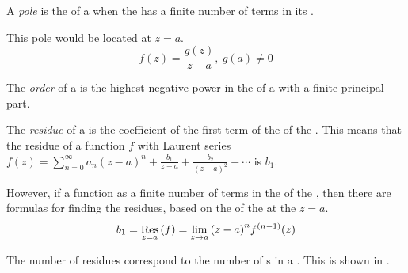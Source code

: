 \begin{definition}[Pole]\label{def:Pole}
  A \emph{pole} is the  of a  when the  has a finite number of terms in its .

  This pole would be located at $z=a$.
  \begin{equation}\label{eq:Pole}
    f(z) = \frac{g(z)}{z-a}, \: g(a) \neq 0
  \end{equation}
\end{definition}

\begin{definition}[Order]\label{def:Pole_Order}
  The \emph{order} of a  is the highest negative power in the  of a  with a finite principal part.
\end{definition}

\begin{definition}[Residue]\label{def:Residue}
  The \emph{residue} of a  is the coefficient of the first term of the  of the .
  This means that the residue of a function $f$ with Laurent series $f(z) = \sum_{n=0}^{\infty} a_{n} {(z-a)}^{n} + \frac{b_{1}}{z-a} + \frac{b_{2}}{{(z-a)}^{2}} + \cdots$ is $b_{1}$.

  However, if a function as a finite number of terms in the  of the , then there are formulas for finding the residues, based on the  of the  at the  $z=a$.
  \begin{equation}\label{eq:Residue}
    b_{1} = \Residue{f}{z=a} = \lim\limits_{z \to a} {(z-a)}^{n} f^{(n-1)}(z)
  \end{equation}

  The number of residues correspond to the number of s in a .
  This is shown in .
\end{definition}

